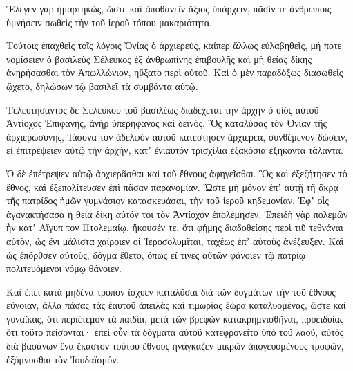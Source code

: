 {Ἔλεγεν γὰρ ἡμαρτηκὼς, ὥστε καὶ ἀποθανεῖν ἄξιος ὑπάρχειν, πᾶσίν τε ἀνθρώποις ὑμνήσειν σωθεὶς τὴν τοῦ ἱεροῦ τόπου μακαριότητα.
\par }{\PP {}Τούτοις ἐπαχθεὶς τοῖς λόγοις Ὀνίας ὁ ἀρχιερεὺς, καίπερ ἄλλως εὐλαβηθεὶς, μή ποτε νομίσειεν ὁ βασιλεὺς Σέλευκος ἐξ ἀνθρωπίνης ἐπιβουλῆς καὶ μὴ θείας δίκης ἀνῃρήσασθαι τὸν Ἀπωλλώνιον, ηὔξατο περὶ αὐτοῦ.
Καὶ ὁ μὲν παραδὸξως διασωθεὶς ᾤχετο, δηλώσων τῷ βασιλεῖ τὰ συμβάντα αὐτῷ.
\par }{\PP {}Τελευτήσαντος δὲ Σελεύκου τοῦ βασιλέως διαδέχεται τὴν ἀρχὴν ὁ υἱὸς αὐτοῦ Ἀντίοχος Ἐπιφανὴς, ἀνὴρ ὑπερήφανος καὶ δεινὸς.
Ὃς καταλύσας τὸν Ὀνίαν τῆς ἀρχιερωσύνης,
Ἰάσονα τὸν ἀδελφὸν αὐτοῦ κατέστησεν ἀρχιερέα, συνθέμενον δώσειν, εἰ ἐπιτρέψειεν αὐτῷ τὴν ἀρχὴν, κατʼ ἐνιαυτὸν τρισχίλια ἐξακόσια ἑξήκοντα τάλαντα.
\par }{\PP {}Ὁ δὲ ἐπέτρεψεν αὐτῷ ἀρχιερᾶσθαι καὶ τοῦ ἔθνους ἀφηγεῖσθαι.
Ὃς καὶ ἐξεζήτησεν τὸ ἔθνος, καὶ ἐξεπολίτευσεν ἐπὶ πᾶσαν παρανομίαν.
Ὥστε μὴ μόνον ἐπʼ αὐτῇ τῆ ἄκρᾳ τῆς πατρίδος ἡμῶν γυμνάσιον κατασκευάσαι, τὴν τοῦ ἱεροῦ κηδεμονίαν.
Ἐφʼ οἷς ἀγανακτήσασα ἡ θεία δίκη αὐτόν τοι τὸν Ἀντίοχον ἐπολέμησεν.
Ἐπειδὴ γὰρ πολεμῶν ἦν κατʼ Αἴγυπ τον Πτολεμαίῳ, ἤκουσέν τε, ὅτι φήμης διαδοθείσης περὶ τιῦ τεθνάναι αὐτὸν, ὡς ἔνι μάλιστα χαίροιεν οἱ Ἱεροσολυμῖται, ταχέως ἐπʼ αὐτοὺς ἀνέζευξεν.
Καὶ ὡς ἐπόρθσεν αὐτοὺς, δόγμα ἔθετο, ὅπως εἴ τινες αὐτῶν φάνοιεν τῷ πατρίῳ πολιτευόμενοι νόμῳ θάνοιεν.
\par }{\PP {}Καὶ ἐπεὶ κατὰ μηδένα τρόπον ἴσχυεν καταλῦσαι διὰ τῶν δογμάτων τὴν τοῦ ἔθνους εὔνοιαν, ἀλλὰ πάσας τὰς ἑαυτοῦ ἀπειλὰς καὶ τιμωρίας ἑώρα καταλυομένας,
ὥστε καὶ γυναῖκας, ὅτι περιέτεμον τὰ παιδία, μετὰ τῶν βρεφῶν κατακρημνισθῆναι, προειδυίας ὅτι τοῦτο πείσονται·
ἐπεὶ οὖν τὰ δόγματα αὑτοῦ κατεφρονεῖτο ὑπὸ τοῦ λαοῦ, αὐτὸς διὰ βασάνων ἕνα ἕκαστον τούτου ἔθνους ἠνάγκαζεν μικρῶν ἀπογευομένους τροφῶν, ἐξόμνυσθαι τὸν Ἰουδαϊσμόν.

}
